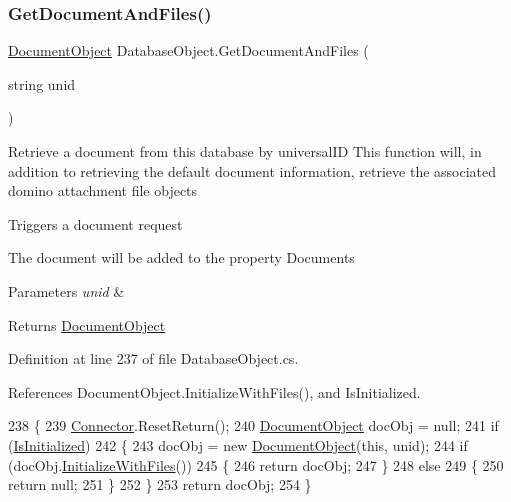 \subsubsection{\texorpdfstring{Get\+Document\+And\+Files()}{GetDocumentAndFiles()}}
{\footnotesize\ttfamily \mbox{\hyperlink{class_document_object}{Document\+Object}} Database\+Object.\+Get\+Document\+And\+Files (\begin{DoxyParamCaption}\item[{string}]{unid }\end{DoxyParamCaption})}



Retrieve a document from this database by universal\+ID This function will, in addition to retrieving the default document information, retrieve the associated domino attachment file objects 

Triggers a document request

The document will be added to the property \textquotesingle{}Documents\textquotesingle{}


\begin{DoxyParams}{Parameters}
{\em unid} & \\
\hline
\end{DoxyParams}
\begin{DoxyReturn}{Returns}
\mbox{\hyperlink{class_document_object}{Document\+Object}}
\end{DoxyReturn}


Definition at line 237 of file Database\+Object.\+cs.



References Document\+Object.\+Initialize\+With\+Files(), and Is\+Initialized.


\begin{DoxyCode}
238     \{
239         \mbox{\hyperlink{class_connector}{Connector}}.ResetReturn();
240         \mbox{\hyperlink{class_document_object}{DocumentObject}} docObj = null;
241         \textcolor{keywordflow}{if} (\mbox{\hyperlink{class_database_object_a5fe036d32a30eb10d1b3f6a30263f740}{IsInitialized}})
242         \{
243             docObj = \textcolor{keyword}{new} \mbox{\hyperlink{class_document_object}{DocumentObject}}(\textcolor{keyword}{this}, unid);
244             \textcolor{keywordflow}{if} (docObj.\mbox{\hyperlink{class_document_object_a83f0e855adc5fb7afd02d2e34767f5c8}{InitializeWithFiles}}())
245             \{
246                 \textcolor{keywordflow}{return} docObj;
247             \}
248             \textcolor{keywordflow}{else}
249             \{
250                 \textcolor{keywordflow}{return} null;
251             \}
252         \}
253         \textcolor{keywordflow}{return} docObj;
254     \}
\end{DoxyCode}
\mbox{\label{class_database_object_a1d35f51baee4be6adb69a954efe5b4bf}} 
